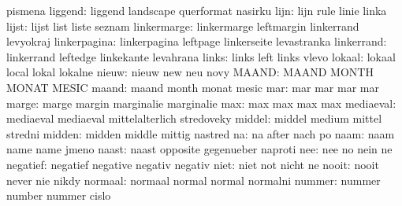                       pismena
            liggend:  liggend              landscape           querformat
                      nasirku
               lijn:  lijn                 rule                linie
                      linka
              lijst:  lijst                list                liste
                      seznam
        linkermarge:  linkermarge          leftmargin          linkerrand
                      levyokraj
       linkerpagina:  linkerpagina         leftpage            linkerseite
                      levastranka
         linkerrand:  linkerrand           leftedge            linkekante
                      levahrana
              links:  links                left                links
                      vlevo
             lokaal:  lokaal               local               lokal
                      lokalne
              nieuw:  nieuw                new                 neu
                      novy
              MAAND:  MAAND                MONTH               MONAT
                      MESIC
              maand:  maand                month               monat
                      mesic
                mar:  mar                  mar                 mar
                      mar
              marge:  marge                margin              marginalie
                      marginalie
                max:  max                  max                 max
                      max
          mediaeval:  mediaeval            mediaeval           mittelalterlich
                      stredoveky
             middel:  middel               medium              mittel
                      stredni
             midden:  midden               middle              mittig
                      nastred
                 na:  na                   after               nach
                      po
               naam:  naam                 name                name
                      jmeno
              naast:  naast                opposite            gegenueber
                      naproti %
                nee:  nee                  no                  nein
                      ne
           negatief:  negatief             negative            negativ
                      negativ
               niet:  niet                 not                 nicht
                      ne
              nooit:  nooit                never               nie
                      nikdy
            normaal:  normaal              normal              normal
                      normalni
             nummer:  nummer               number              nummer
                      cislo
